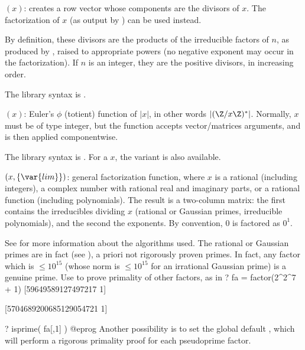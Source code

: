 $(x)$: \label{se:divisors}creates a row vector whose components are the
divisors of $x$. The factorization of $x$ (as output by ) can
be used instead.

By definition, these divisors are the products of the irreducible
factors of $n$, as produced by , raised to appropriate
powers (no negative exponent may occur in the factorization). If $n$ is
an integer, they are the positive divisors, in increasing order.

The library syntax is .

$(x)$: \label{se:eulerphi}Euler's $\phi$ (totient) function of $|x|$,
in other words $|(\Z/x\Z)^*|$. Normally, $x$ must be of type integer, but
the function accepts vector/matrices arguments, and is then applied
componentwise.

The library syntax is .
For a  $x$, the variant
 is also available.

$(x,\{\var{lim}\})$: \label{se:factor}general factorization function, where $x$ is a
rational (including integers), a complex number with rational
real and imaginary parts, or a rational function (including polynomials).
The result is a two-column matrix: the first contains the irreducibles
dividing $x$ (rational or Gaussian primes, irreducible polynomials),
and the second the exponents. By convention, $0$ is factored as $0^1$.

See  for more information about the algorithms used.
The rational or Gaussian primes are in fact 
(see ), a priori not rigorously proven primes. In fact,
any factor which is $\leq 10^{15}$ (whose norm is $\leq 10^{15}$ for an
irrational Gaussian prime) is a genuine prime. Use
 to prove primality of other factors, as in
\bprog
? fa = factor(2^2^7 + 1)
[59649589127497217 1]

[5704689200685129054721 1]

? isprime( fa[,1] )
@eprog\noindent
Another possibility is to set the global default , which
will perform a rigorous primality proof for each pseudoprime factor.


